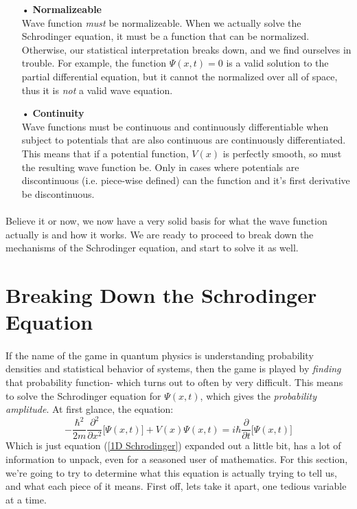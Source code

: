\documentclass[12pt,letterpaper]{book}
\begin{document}
\begin{enumerate}
\item[•]\textbf{Normalizeable}\\
Wave function \textit{must} be normalizeable. When we actually solve the Schrodinger equation, it must be a function that can be normalized. Otherwise, our statistical interpretation breaks down, and we find ourselves in trouble. For example, the function $\Psi(x,t) = 0$ is a valid solution to the partial differential equation, but it cannot the normalized over all of space, thus it is \textit{not} a valid wave equation.
\item[•]\textbf{Continuity}\\
Wave functions must be continuous and continuously differentiable when subject to potentials that are also continuous are continuously differentiated. This means that if a potential function, $V(x)$ is perfectly smooth, so must the resulting wave function be. Only in cases where potentials are discontinuous (i.e. piece-wise defined) can the function and it's first derivative be discontinuous.
\end{enumerate}

\paragraph*{}Believe it or now, we now have a very solid basis for what the wave function actually is and how it works. We are ready to proceed to break down the mechanisms of the Schrodinger equation, and start to solve it as well.


\section{Breaking Down the Schrodinger Equation}
\paragraph*{}If the name of the game in quantum physics is understanding probability densities and statistical behavior of systems, then the game is played by \textit{finding} that probability function- which turns out to often by very difficult. This means to solve the Schrodinger equation for $\Psi(x,t)$, which gives the \textit{probability amplitude}. At first glance, the equation:
\begin{equation}
\label{1D Schrodinger expanded}
-\frac{\hbar^2}{2m}\frac{\partial^2}{\partial x^2}\Big[ \Psi(x,t) \Big] +
V(x)\Psi(x,t) = i\hbar\frac{\partial}{\partial t}\Big[ \Psi(x,t) \Big]
\end{equation}
Which is just equation (\ref{1D Schrodinger}) expanded out a little bit, has a lot of information to unpack, even for a seasoned user of mathematics. For this section, we're going to try to determine what this equation is actually trying to tell us, and what each piece of it means. First off, lets take it apart, one tedious variable at a time. 
\end{document}
